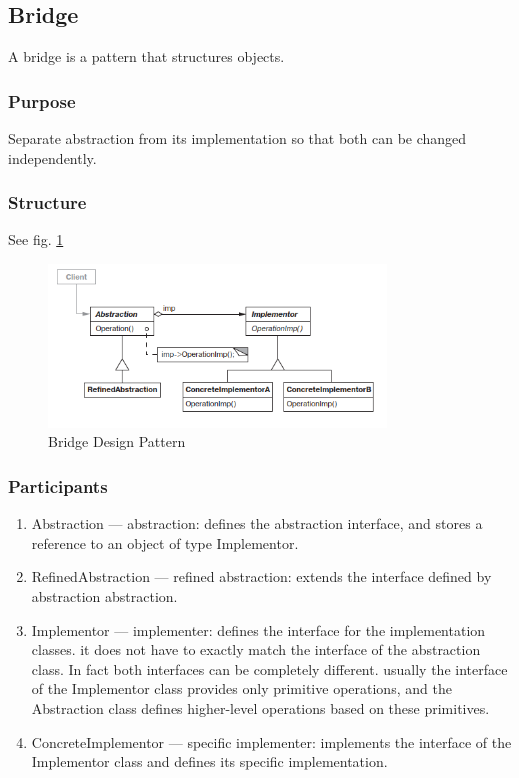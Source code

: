 \documentclass[sigplan,12pt,nonacm=true,review=false]{acmart}
\begin{document}
\subsection{Bridge}
A bridge is a pattern that structures objects.

\subsubsection{Purpose}
Separate abstraction from its implementation so that both can be changed independently.

\subsubsection{Structure}
See fig. \ref{fig:8}
\begin{figure}
    \centering
    \includegraphics[width=0.8\textwidth]{eolang/tr-02/assets/Picture8.png}
    \caption{Bridge Design Pattern}
    \label{fig:8}
\end{figure}

\subsubsection{Participants}
\begin{enumerate}
    \item Abstraction — abstraction: defines the abstraction interface, and stores a reference to an object of type Implementor.
    \item RefinedAbstraction —  refined abstraction: extends the interface defined by abstraction abstraction.
    \item Implementor — implementer: defines the interface for the implementation classes. it does not have to exactly match the interface of the abstraction class. In fact both interfaces can be completely different. usually the interface of the Implementor class provides only primitive operations, and the  Abstraction class defines higher-level operations based on these primitives.
    \item ConcreteImplementor —  specific implementer: implements the interface of the Implementor class and defines its specific implementation.
\end{enumerate}
\end{document}
